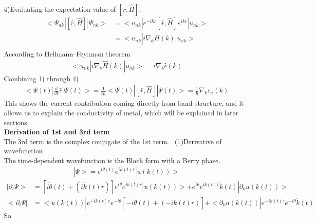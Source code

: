\documentclass[a4paper]{article}
\begin{document}
4)Evaluating the expectation value of $ [r, \hat H] $,
\begin{align*}
<\Psi_{nk}| [\hat r, \hat H ]| \Psi_{nk}> 
&= <u_{nk}| e^{-ikr}[\hat r, \hat H] e^{ikr}|u_{nk}>\\
& = <u_{nk}| i \nabla_k \hat H(k)|u_{nk}> \\
\end{align*}
According to Hellmann–Feynman theorem
\begin{align*}
<u_{nk}| i \nabla_k \hat H(k)|u_{nk}> = i \nabla_k \hat \epsilon(k)
\end{align*}
Combining 1) through 4)
\begin{align*}
<\Psi(t)|\frac{d}{dt}\hat r|\Psi(t)> = \frac{1}{i\hbar}<\Psi(t)|[\hat r,\hat H]|\Psi(t)> = \frac{1}{\hbar}\nabla_k \epsilon_n(k)
\end{align*}
This shows the current contribution coming directly from band structure, and it allows us to explain the conductivity of metal, which will be explained in later sections.\\
{\bf Derivation of 1st and 3rd term\\}
The 3rd term is the complex conjugate of the 1st term. \
{(1)Derivative of wavefunction\\}
The time-dependent wavefunction is the Bloch form with a Berry phase.
\begin{align*}
|\Psi> = e^{i\theta(t)}e^{ik(t)r}|u(k(t))>
\end{align*}  
\begin{align*}
 | \partial_t\Psi> & =[i\dot \theta(t)  + (i\dot k(t)r)] e^{i\theta}e^{ik(t)r}|u(k(t))>+ e^{i\theta}e^{ik(t)r} \dot k(t)|\partial_ku(k(t))> \\
<\partial_t \Psi | & = <u(k(t))|e^{-ik(t)r}e^{-i\theta}[-i\dot \theta(t) + (-ik(t)r)] +<\partial_k u(k(t))|e^{-ik(t)r}e^{-i\theta}\dot k(t) 
\end{align*}
So
\end{document}
